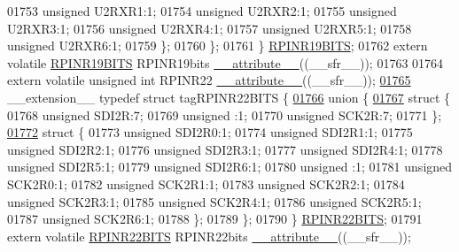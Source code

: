\begin{DoxyCode}
01753       \textcolor{keywordtype}{unsigned} U2RXR1:1;
01754       \textcolor{keywordtype}{unsigned} U2RXR2:1;
01755       \textcolor{keywordtype}{unsigned} U2RXR3:1;
01756       \textcolor{keywordtype}{unsigned} U2RXR4:1;
01757       \textcolor{keywordtype}{unsigned} U2RXR5:1;
01758       \textcolor{keywordtype}{unsigned} U2RXR6:1;
01759     \};
01760   \};
01761 \} \hyperlink{a00008_d8/dcb/a00706}{RPINR19BITS};
01762 \textcolor{keyword}{extern} \textcolor{keyword}{volatile} \hyperlink{a00008_d8/dcb/a00706}{RPINR19BITS} RPINR19bits \hyperlink{a00009_a493c46f03454991ccc5aa7a6e1dfb2a7}{\_\_attribute\_\_}((\_\_sfr\_\_));
01763 
01764 \textcolor{keyword}{extern} \textcolor{keyword}{volatile} \textcolor{keywordtype}{unsigned} \textcolor{keywordtype}{int}  RPINR22 \hyperlink{a00009_a493c46f03454991ccc5aa7a6e1dfb2a7}{\_\_attribute\_\_}((\_\_sfr\_\_));
\hypertarget{a00009_source_l01765}{}\hyperlink{a00008}{01765} \_\_extension\_\_ \textcolor{keyword}{typedef} \textcolor{keyword}{struct }tagRPINR22BITS \{
\hypertarget{a00009_source_l01766}{}\hyperlink{a00009}{01766}   \textcolor{keyword}{union }\{
\hypertarget{a00009_source_l01767}{}\hyperlink{a00009}{01767}     \textcolor{keyword}{struct }\{
01768       \textcolor{keywordtype}{unsigned} SDI2R:7;
01769       \textcolor{keywordtype}{unsigned} :1;
01770       \textcolor{keywordtype}{unsigned} SCK2R:7;
01771     \};
\hypertarget{a00009_source_l01772}{}\hyperlink{a00009}{01772}     \textcolor{keyword}{struct }\{
01773       \textcolor{keywordtype}{unsigned} SDI2R0:1;
01774       \textcolor{keywordtype}{unsigned} SDI2R1:1;
01775       \textcolor{keywordtype}{unsigned} SDI2R2:1;
01776       \textcolor{keywordtype}{unsigned} SDI2R3:1;
01777       \textcolor{keywordtype}{unsigned} SDI2R4:1;
01778       \textcolor{keywordtype}{unsigned} SDI2R5:1;
01779       \textcolor{keywordtype}{unsigned} SDI2R6:1;
01780       \textcolor{keywordtype}{unsigned} :1;
01781       \textcolor{keywordtype}{unsigned} SCK2R0:1;
01782       \textcolor{keywordtype}{unsigned} SCK2R1:1;
01783       \textcolor{keywordtype}{unsigned} SCK2R2:1;
01784       \textcolor{keywordtype}{unsigned} SCK2R3:1;
01785       \textcolor{keywordtype}{unsigned} SCK2R4:1;
01786       \textcolor{keywordtype}{unsigned} SCK2R5:1;
01787       \textcolor{keywordtype}{unsigned} SCK2R6:1;
01788     \};
01789   \};
01790 \} \hyperlink{a00008_d3/dda/a00712}{RPINR22BITS};
01791 \textcolor{keyword}{extern} \textcolor{keyword}{volatile} \hyperlink{a00008_d3/dda/a00712}{RPINR22BITS} RPINR22bits \hyperlink{a00009_a493c46f03454991ccc5aa7a6e1dfb2a7}{\_\_attribute\_\_}((\_\_sfr\_\_));

\end{DoxyCode}
